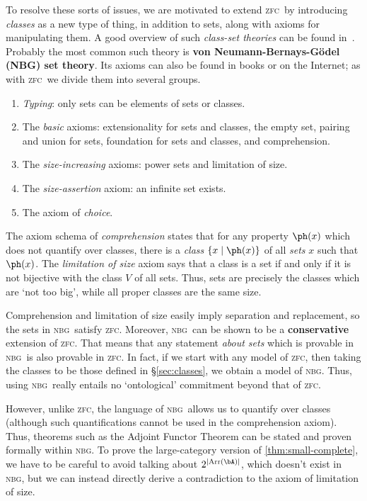 \documentclass{amsart}
\def\zfc{\textsc{zfc}}
\def\nbg{\textsc{nbg}}
\begin{document}
To resolve these sorts of issues, we are motivated to extend \zfc\ by
introducing \emph{classes} as a new type of thing, in addition to
sets, along with axioms for manipulating them.  A good overview of
such \emph{class-set theories} can be found in~\cite{levy:classes}.
Probably the most common such theory is \textbf{von
  Neumann-Bernays-G\"odel (NBG) set theory}.  Its axioms can also be
found in books or on the Internet; as with \zfc\ we divide them into
several groups.
\begin{enumerate}
\item \emph{Typing}: only sets can be elements of sets or classes.
\item The \emph{basic} axioms: extensionality for sets and classes,
  the empty set, pairing and union for sets, foundation for sets and
  classes, and comprehension.
\item The \emph{size-increasing} axioms: power sets and limitation of
  size.
\item The \emph{size-assertion} axiom: an infinite set exists.
\item The axiom of \emph{choice}.
\end{enumerate}
The axiom schema of \emph{comprehension} states that for any property
$\ph(x)$ which does not quantify over classes, there is a \emph{class}
$\{x \mid \ph(x)\}$ of all \emph{sets} $x$ such that $\ph(x)$.  The
\emph{limitation of size} axiom says that a class is a set if and only
if it is not bijective with the class $V$ of all sets.  Thus, sets are
precisely the classes which are `not too big', while all proper
classes are the same size.

Comprehension and limitation of size easily imply separation and
replacement, so the sets in \nbg\ satisfy \zfc.  Moreover, \nbg\ can
be shown to be a \textbf{conservative} extension of \zfc.  That means
that any statement \emph{about sets} which is provable in \nbg\ is
also provable in \zfc.  In fact, if we start with any model of \zfc,
then taking the classes to be those defined in \S\ref{sec:classes}, we
obtain a model of \nbg.  Thus, using \nbg\ really entails no
`ontological' commitment beyond that of \zfc.

However, unlike \zfc, the language of \nbg\ allows us to quantify over
classes (although such quantifications cannot be used in the
comprehension axiom).  Thus, theorems such as the Adjoint Functor
Theorem can be stated and proven formally within \nbg.  To prove the
large-category version of \autoref{thm:small-complete}, we have to be
careful to avoid talking about $2^{|\mathrm{Arr}(\bA)|}$, which
doesn't exist in \nbg, but we can instead directly derive a
contradiction to the axiom of limitation of size.
\end{document}
